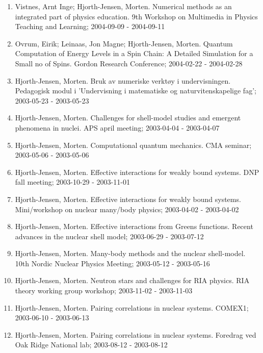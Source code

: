 \documentclass[%
oneside,                 %
final,                   %
10pt]{article}
\begin{document}
\begin{enumerate}
\item Vistnes, Arnt Inge; Hjorth-Jensen, Morten. Numerical methods as an integrated part of physics education. 9th Workshop on Multimedia in Physics Teaching and Learning; 2004-09-09 - 2004-09-11

\item Ovrum, Eirik; Leinaas, Jon Magne; Hjorth-Jensen, Morten. Quantum Computation of Energy Levels in a Spin Chain: A Detailed Simulation for a Small no of Spins. Gordon Research Conference; 2004-02-22 - 2004-02-28

\item Hjorth-Jensen, Morten. Bruk av numeriske verktøy i undervisningen. Pedagogisk modul i 'Undervisning i matematiske og naturvitenskapelige fag'; 2003-05-23 - 2003-05-23

\item Hjorth-Jensen, Morten. Challenges for shell-model studies and emergent phenomena in nuclei. APS april meeting; 2003-04-04 - 2003-04-07

\item Hjorth-Jensen, Morten.  Computational quantum mechanics. CMA seminar; 2003-05-06 - 2003-05-06

\item Hjorth-Jensen, Morten. Effective interactions for weakly bound systems. DNP fall meeting; 2003-10-29 - 2003-11-01

\item Hjorth-Jensen, Morten. Effective interactions for weakly bound systems. Mini/workshop on nuclear many/body physics; 2003-04-02 - 2003-04-02

\item Hjorth-Jensen, Morten. Effective interactions from Greens functions. Recent advances in the nuclear shell model; 2003-06-29 - 2003-07-12

\item Hjorth-Jensen, Morten. Many-body methods and the nuclear shell-model. 10th Nordic Nuclear Physics Meeting; 2003-05-12 - 2003-05-16

\item Hjorth-Jensen, Morten. Neutron stars and challenges for RIA physics. RIA theory working group workshop; 2003-11-02 - 2003-11-03

\item Hjorth-Jensen, Morten. Pairing correlations in nuclear systems. COMEX1; 2003-06-10 - 2003-06-13

\item Hjorth-Jensen, Morten. Pairing correlations in nuclear systems. Foredrag ved Oak Ridge National lab; 2003-08-12 - 2003-08-12


\end{enumerate}
\end{document}
